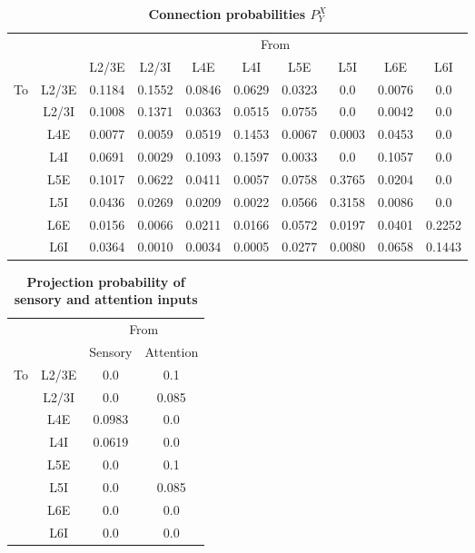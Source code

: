 \documentclass[10pt,letterpaper]{article}
\begin{document}
\begin{table}[!ht]
\centering
\caption{
{\bf Connection probabilities $P_{Y}^{X}$}}
\begin{tabular}[t]{cccccccccc}
\toprule
&&\multicolumn{8}{c}{From} \\
&& L2/3E & L2/3I & L4E & L4I & L5E & L5I & L6E & L6I \\
\midrule
\multirow{8}{*}{To} & \multicolumn{1}{c|}{L2/3E} & 0.1184 & 0.1552 & 0.0846 & 0.0629 & 0.0323 & 0.0 & 0.0076 & 0.0 \\ %

&\multicolumn{1}{c|}{L2/3I} & 0.1008 & 0.1371 & 0.0363 & 0.0515 & 0.0755 & 0.0 & 0.0042 & 0.0 \\ %
&\multicolumn{1}{c|}{L4E} & 0.0077 & 0.0059 & 0.0519 & 0.1453 & 0.0067 & 0.0003 & 0.0453 & 0.0 \\ %
&\multicolumn{1}{c|}{L4I} & 0.0691 & 0.0029 & 0.1093 & 0.1597 & 0.0033 & 0.0 & 0.1057 & 0.0 \\ %
&\multicolumn{1}{c|}{L5E} & 0.1017 & 0.0622 & 0.0411 & 0.0057 & 0.0758 & 0.3765 & 0.0204 & 0.0 \\ %
&\multicolumn{1}{c|}{L5I} & 0.0436 & 0.0269 & 0.0209 & 0.0022 & 0.0566 & 0.3158 & 0.0086 & 0.0 \\ %
&\multicolumn{1}{c|}{L6E} & 0.0156 & 0.0066 & 0.0211 & 0.0166 & 0.0572 & 0.0197 & 0.0401 & 0.2252 \\ %
&\multicolumn{1}{c|}{L6I} & 0.0364 & 0.0010 & 0.0034 & 0.0005 & 0.0277 & 0.0080 & 0.0658 & 0.1443 \\ %
\bottomrule
\end{tabular}
\label{table2}
\end{table}

\begin{table}[!ht]
\centering
\caption{
{\bf Projection probability of sensory and attention inputs}}
\begin{tabular}[t]{cccc}
\toprule
&&\multicolumn{2}{c}{From} \\
&& Sensory & Attention \\
\midrule
\multirow{8}{*}{To} & \multicolumn{1}{c|}{L2/3E} & 0.0 & 0.1 \\ %
&\multicolumn{1}{c|}{L2/3I} & 0.0 & 0.085 \\ %
&\multicolumn{1}{c|}{L4E} & 0.0983 & 0.0 \\ %
&\multicolumn{1}{c|}{L4I} & 0.0619 & 0.0 \\ %
&\multicolumn{1}{c|}{L5E} &  0.0 & 0.1 \\ %
&\multicolumn{1}{c|}{L5I} &  0.0 & 0.085 \\ %
&\multicolumn{1}{c|}{L6E} &  0.0 & 0.0 \\ %
&\multicolumn{1}{c|}{L6I} &  0.0 & 0.0 \\ %
\bottomrule
\end{tabular}
\label{table3}
\end{table}
\end{document}
